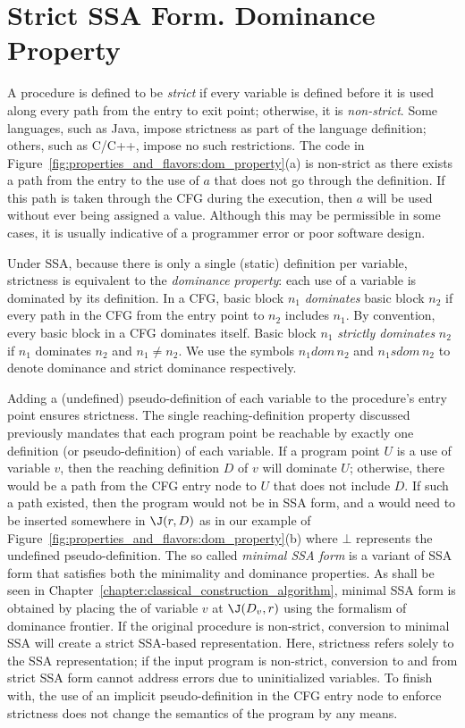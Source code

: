 \section{Strict SSA Form. Dominance Property}
\label{sec:properties_and_flavours:domprop}
A procedure is defined to be \emph{strict} if every variable
is defined before it is used along every path from the entry
to exit point; otherwise, it is \emph{non-strict}. 
Some languages, such as Java, impose strictness as part of the language
definition; others, such as C/C++, impose no such restrictions. 
The code in Figure~\ref{fig:properties_and_flavors:dom_property}(a) is non-strict as there exists a path from the entry to the use of $a$ that does not go through the definition. 
If this path is taken through the CFG during the execution, then $a$ will be used without ever
being assigned a value. Although this may be permissible in
some cases, it is usually indicative of a programmer error or poor software design. 

Under SSA, because there is only a single
(static) definition per variable, strictness is equivalent to the
\emph{dominance property}: each use of a variable is dominated by
its definition.
In a CFG, basic block $n_{1}$ \emph{dominates} basic block $n_{2}$
if every path in the CFG from the entry point to $n_{2}$ includes
$n_{1}$. By convention, every basic block in a CFG dominates itself. Basic 
block $n_{1}$ \emph{strictly dominates} $n_{2}$ if $n_{1}$ dominates
$n_{2}$ and $n_{1} \neq n_{2}$. We use the symbols $n_{1} dom\, n_{2}$
and $n_{1} sdom\, n_{2}$ to denote dominance and strict dominance 
respectively.


Adding a (undefined) pseudo-definition of each variable to the procedure's entry
point ensures strictness. 
The single reaching-definition property discussed previously mandates that each
program point be reachable by exactly one definition (or pseudo-definition)
of each variable. If a program point $U$ is a use of variable $v$, then the
reaching definition $D$ of $v$ will dominate $U$; otherwise, there would be a path
from the CFG entry node to $U$ that does not include $D$. If such a  path existed, then the program would not be in SSA form, and a \phifun would need to be inserted somewhere
in $\J(r,D)$ as in our example of Figure~\ref{fig:properties_and_flavors:dom_property}(b) where $\bot$ represents the undefined pseudo-definition. The so called \emph{minimal SSA form} is a variant of SSA form that satisfies both the minimality and dominance properties. As shall be seen in Chapter~\ref{chapter:classical_construction_algorithm}, minimal SSA form is obtained by placing the \phifuns of variable $v$ at $\J(D_v,r)$ using the formalism of dominance frontier.
If the original procedure is non-strict, conversion to minimal SSA
will create a strict SSA-based representation. Here, strictness refers
solely to the SSA representation; if the input program is non-strict,
conversion to and from strict SSA form cannot address errors due
to uninitialized variables. To finish with, the use of an implicit pseudo-definition in the CFG entry node to enforce strictness does not change the semantics of the program by any means.



